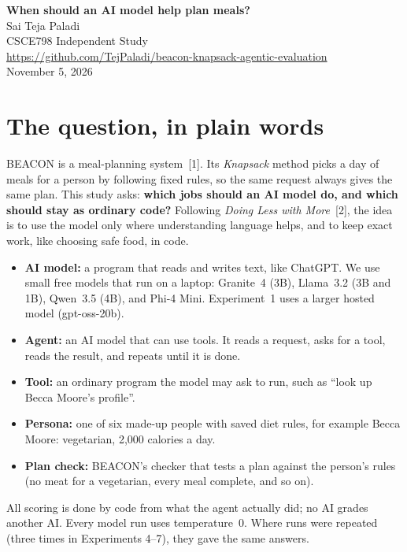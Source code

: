\documentclass[11pt]{article}
\begin{document}
\begin{center}
{\Large\bfseries When should an AI model help plan meals?}\\[6pt]
Sai Teja Paladi\\
CSCE798 Independent Study\\
\url{https://github.com/TejPaladi/beacon-knapsack-agentic-evaluation}\\
November 5, 2026
\end{center}

\section{The question, in plain words}

BEACON is a meal-planning system~[1]. Its \emph{Knapsack} method picks a day of
meals for a person by following fixed rules, so the same request always gives the
same plan. This study asks: \textbf{which jobs should an AI model do, and which
should stay as ordinary code?} Following \emph{Doing Less with More}~[2], the
idea is to use the model only where understanding language helps, and to keep
exact work, like choosing safe food, in code.

\begin{itemize}
  \item \textbf{AI model:} a program that reads and writes text, like ChatGPT. We
        use small free models that run on a laptop: Granite~4 (3B), Llama~3.2 (3B
        and 1B), Qwen~3.5 (4B), and Phi-4 Mini. Experiment~1 uses a larger hosted
        model (gpt-oss-20b).
  \item \textbf{Agent:} an AI model that can use tools. It reads a request, asks
        for a tool, reads the result, and repeats until it is done.
  \item \textbf{Tool:} an ordinary program the model may ask to run, such as
        ``look up Becca Moore's profile''.
  \item \textbf{Persona:} one of six made-up people with saved diet rules, for
        example Becca Moore: vegetarian, 2,000 calories a day.
  \item \textbf{Plan check:} BEACON's checker that tests a plan against the
        person's rules (no meat for a vegetarian, every meal complete, and so on).
\end{itemize}

All scoring is done by code from what the agent actually did; no AI grades
another AI. Every model run uses temperature~0. Where runs were repeated (three times in
Experiments 4--7), they gave the same answers.
\end{document}
